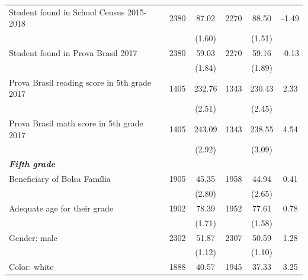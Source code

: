 \documentclass[
	article,			%
	12pt,				%
	oneside,			%
	a4paper,			%
	]{article}
\begin{document}
\begin{table}[h!]
\begin{threeparttable}
\begin{tabular*}{\textwidth}{@{\extracolsep{\fill}}lccccc@{}}
Student found in School Census 2015-2018 &       2380 &      87.02 &       2270 &      88.50 &      -1.49 \\

           &            &     (1.60) &            &     (1.51) &            \\

Student found in Prova Brasil 2017 &       2380 &      59.03 &       2270 &      59.16 &      -0.13 \\

           &            &     (1.84) &            &     (1.89) &            \\

Prova Brasil reading score in 5th grade 2017 &       1405 &     232.76 &       1343 &     230.43 &       2.33 \\

           &            &     (2.51) &            &     (2.45) &            \\

Prova Brasil math score in 5th grade 2017 &       1405 &     243.09 &       1343 &     238.55 &       4.54 \\

           &            &     (2.92) &            &     (3.09) &            \\

{\it {\bf Fifth grade}} &            &            &            &            &            \\

Beneficiary of Bolsa Família &       1905 &      45.35 &       1958 &      44.94 &       0.41 \\

           &            &     (2.80) &            &     (2.65) &            \\

Adequate age for their grade &       1902 &      78.39 &       1952 &      77.61 &       0.78 \\

           &            &     (1.71) &            &     (1.58) &            \\

Gender: male &       2302 &      51.87 &       2307 &      50.59 &       1.28 \\

           &            &     (1.12) &            &     (1.10) &            \\

Color: white &       1888 &      40.57 &       1945 &      37.33 &       3.25 \\


\end{tabular*}
\end{threeparttable}
\end{table}
\end{document}
